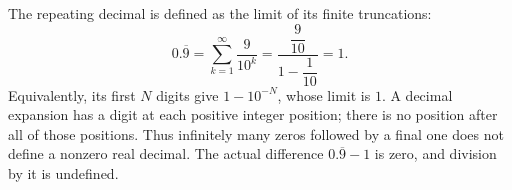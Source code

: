 The repeating decimal is defined as the limit of its finite truncations:
\[
0.\overline9=\sum_{k=1}^{\infty}\dfrac{9}{10^k}
=\dfrac{\dfrac{9}{10}}{1-\dfrac{1}{10}}=1.
\]
Equivalently, its first $N$ digits give $1-10^{-N}$, whose limit is $1$.
A decimal expansion has a digit at each positive integer position; there is no position after all of those positions. Thus infinitely many zeros followed by a final one does not define a nonzero real decimal. The actual difference $0.\overline9-1$ is zero, and division by it is undefined.
